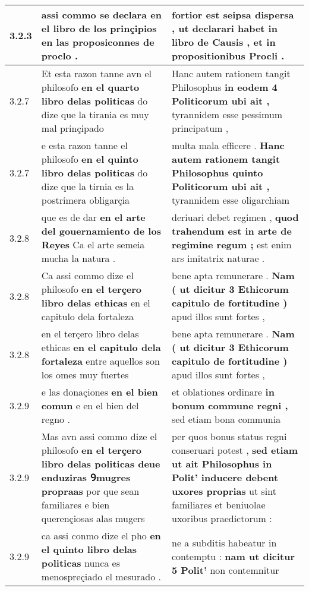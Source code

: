 \begin{tabular}{|p{1cm}|p{6.5cm}|p{6.5cm}|}
3.2.3 & assi commo se declara \textbf{ en el libro de los prinçipios } en las proposiconnes de proclo . & fortior est seipsa dispersa , \textbf{ ut declarari habet in libro de Causis , } et in propositionibus Procli . \\\hline
3.2.7 & Et esta razon tanne avn el philosofo \textbf{ en el quarto libro delas politicas } do dize que la tirania es muy mal prinçipado & Hanc autem rationem tangit Philosophus \textbf{ in eodem 4 Politicorum ubi ait , } tyrannidem esse pessimum principatum , \\\hline
3.2.7 & e esta razon tanne el philosofo \textbf{ en el quinto libro delas politicas } do dize que la tirnia es la postrimera obligarçia & multa mala efficere . \textbf{ Hanc autem rationem tangit Philosophus quinto Politicorum ubi ait , } tyrannidem esse oligarchiam \\\hline
3.2.8 & que es de dar \textbf{ en el arte del gouernamiento de los Reyes } Ca el arte semeia mucha la natura . & deriuari debet regimen , \textbf{ quod trahendum est in arte de regimine regum ; } est enim ars imitatrix naturae . \\\hline
3.2.8 & Ca assi commo dize el philosofo \textbf{ en el terçero libro delas ethicas } en el capitulo dela fortaleza & bene apta remunerare . \textbf{ Nam ( ut dicitur 3 Ethicorum capitulo de fortitudine ) } apud illos sunt fortes , \\\hline
3.2.8 & en el terçero libro delas ethicas \textbf{ en el capitulo dela fortaleza } entre aquellos son los omes muy fuertes & bene apta remunerare . \textbf{ Nam ( ut dicitur 3 Ethicorum capitulo de fortitudine ) } apud illos sunt fortes , \\\hline
3.2.9 & e las donaçiones \textbf{ en el bien comun } e en el bien del regno . & et oblationes ordinare \textbf{ in bonum commune regni , } sed etiam bona communia \\\hline
3.2.9 & Mas avn assi commo dize el philosofo \textbf{ en el terçero libro delas politicas deue enduziras Ꝯmugres propraas } por que sean familiares e bien querençiosas alas mugers & per quos bonus status regni conseruari potest , \textbf{ sed etiam ut ait Philosophus in Polit’ inducere debent uxores proprias } ut sint familiares et beniuolae uxoribus praedictorum : \\\hline
3.2.9 & ca assi conmo dize el pho \textbf{ en el quinto libro delas politicas } nunca es menospreçiado el mesurado . & ne a subditis habeatur in contemptu : \textbf{ nam ut dicitur 5 Polit’ } non contemnitur \\\hline

\end{tabular}
